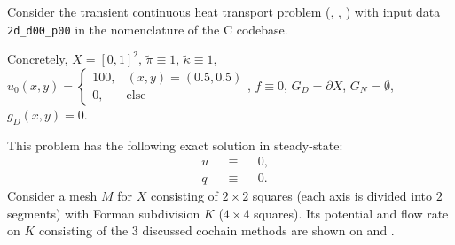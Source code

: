 \begin{example}
  \label{cmc/diffusion/continuous/transient/examples/2d_d00_p00-example}
  Consider the transient continuous heat transport problem
  (,
   ,
   )
  with input data \verb|2d_d00_p00| in the nomenclature of the C codebase.

  Concretely,
    $X = [0, 1]^2$,
    $\tilde{\pi} \equiv 1$,
    $\tilde{\kappa} \equiv 1$,
    $u_0(x, y) =
      \begin{cases}
        100, & (x, y) = (0.5, 0.5) \\
        0, & \text{else}
      \end{cases}$,
    $f \equiv 0$,
    $G_D = \partial X$,
    $G_N = \emptyset$,
    $g_D(x, y) = 0$.

  This problem has the following exact solution in steady-state:
  \begin{subequations}
    \begin{alignat}{3}
      & u && \equiv && 0, \\
      & q && \equiv && 0.
    \end{alignat}
  \end{subequations}
  Consider a mesh $M$ for $X$ consisting of $2 \times 2$ squares (each axis is
  divided into $2$ segments) with Forman subdivision $K$ ($4 \times 4$ squares).
  Its potential and flow rate on $K$ consisting of the $3$ discussed cochain
  methods are shown on
  and
  .
\end{example}

